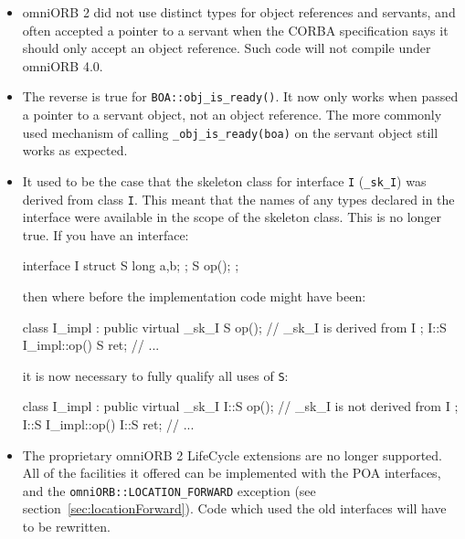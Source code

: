 \documentclass[11pt,twoside,a4paper]{book}
\newcommand{\type}[1]{\texttt{#1}}
\newcommand{\intf}[1]{\texttt{#1}}
\newcommand{\code}[1]{\texttt{#1}}
\newcommand{\op}[1]{\texttt{#1()}}
\begin{document}
\begin{itemize}

\item omniORB 2 did not use distinct types for object references and
servants, and often accepted a pointer to a servant when the CORBA
specification says it should only accept an object reference. Such
code will not compile under omniORB 4.0.

\item The reverse is true for \op{BOA::obj\_is\_ready}. It now only
works when passed a pointer to a servant object, not an object
reference. The more commonly used mechanism of calling
\code{\_obj\_is\_ready(boa)} on the servant object still works as
expected.

\item It used to be the case that the skeleton class for interface
\intf{I} (\type{\_sk\_I}) was derived from class \type{I}. This meant
that the names of any types declared in the interface were available
in the scope of the skeleton class. This is no longer true. If you
have an interface:

\begin{idllisting}
interface I {
  struct S {
    long a,b;
  };
  S op();
};
\end{idllisting}

\noindent then where before the implementation code might have been:

\begin{cxxlisting}
class I_impl : public virtual _sk_I {
  S op();  // _sk_I is derived from I
};
I::S I_impl::op() {
  S ret;
  // ...
}
\end{cxxlisting}

\noindent it is now necessary to fully qualify all uses of \type{S}:

\begin{cxxlisting}
class I_impl : public virtual _sk_I {
  I::S op(); // _sk_I is not derived from I
};
I::S I_impl::op() {
  I::S ret;
  // ...
}
\end{cxxlisting}


\item The proprietary omniORB 2 LifeCycle extensions are no longer
supported. All of the facilities it offered can be implemented with
the POA interfaces, and the \code{omniORB::LOCATION\_FORWARD}
exception (see section~\ref{sec:locationForward}). Code which used the
old interfaces will have to be rewritten.


\end{itemize}
\end{document}

